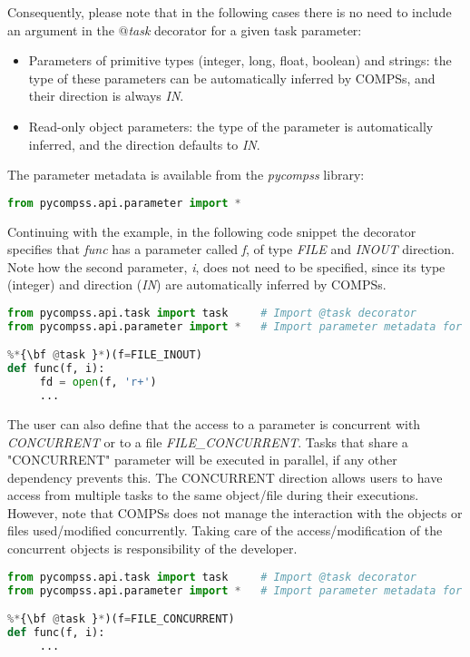 Consequently, please note that in the following cases there is no need to include an argument in 
the {\it $@$task} decorator for a given task parameter:

\begin{itemize}
 \item Parameters of primitive types (integer, long, float, boolean) and strings: the type of these 
       parameters can be automatically inferred by COMPSs, and their direction is always {\it IN}.
 \item Read-only object parameters: the type of the parameter is automatically inferred, and the 
       direction defaults to {\it IN}.
\end{itemize}

The parameter metadata is available from the {\it pycompss} library:

\begin{lstlisting}[language=python]
from pycompss.api.parameter import *
\end{lstlisting}
 
Continuing with the example, in the following code snippet the decorator specifies that {\it func} 
has a parameter called {\it f}, of type {\it FILE} and {\it INOUT} direction. Note how the second 
parameter, {\it i}, does not need to be specified, since its type (integer) and direction ({\it IN}) 
are automatically inferred by COMPSs.

\begin{lstlisting}[language=python]
from pycompss.api.task import task     # Import @task decorator
from pycompss.api.parameter import *   # Import parameter metadata for the @task decorator

%*{\bf @task }*)(f=FILE_INOUT)
def func(f, i):
     fd = open(f, 'r+')
     ...
\end{lstlisting}

The user can also define that the access to a parameter is concurrent with {\it CONCURRENT} or to a file {\it FILE\_CONCURRENT}.
Tasks that share a "CONCURRENT" parameter will be executed in parallel, if any other dependency prevents this. 
The CONCURRENT direction allows users to have access from multiple tasks to the same object/file during their executions.
However, note that COMPSs does not manage the interaction with the objects or files used/modified concurrently.
Taking care of the access/modification of the concurrent objects is responsibility of the developer.

\begin{lstlisting}[language=python]
from pycompss.api.task import task     # Import @task decorator
from pycompss.api.parameter import *   # Import parameter metadata for the @task decorator

%*{\bf @task }*)(f=FILE_CONCURRENT)
def func(f, i):
     ...
\end{lstlisting}

